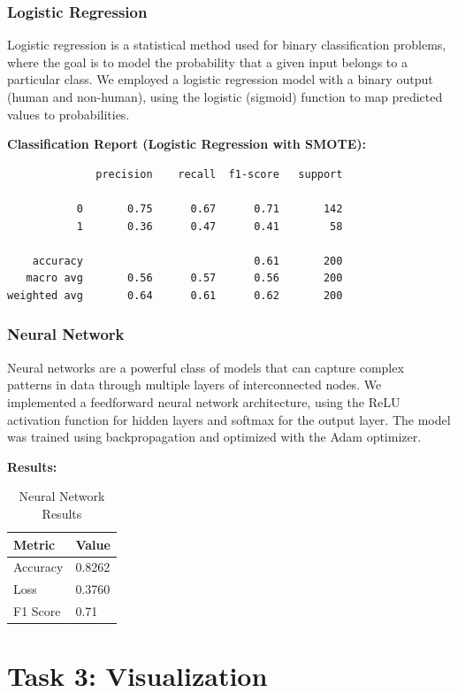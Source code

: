 \documentclass[a4paper,11pt]{article}
\begin{document}
\subsubsection*{Logistic Regression}
Logistic regression is a statistical method used for binary classification problems, where the goal is to model the probability that a given input belongs to a particular class. We employed a logistic regression model with a binary output (human and non-human), using the logistic (sigmoid) function to map predicted values to probabilities.

\textbf{Classification Report (Logistic Regression with SMOTE):}
\begin{verbatim}
              precision    recall  f1-score   support

           0       0.75      0.67      0.71       142
           1       0.36      0.47      0.41        58

    accuracy                           0.61       200
   macro avg       0.56      0.57      0.56       200
weighted avg       0.64      0.61      0.62       200
\end{verbatim}



\subsubsection*{Neural Network}
Neural networks are a powerful class of models that can capture complex patterns in data through multiple layers of interconnected nodes. We implemented a feedforward neural network architecture, using the ReLU activation function for hidden layers and softmax for the output layer. The model was trained using backpropagation and optimized with the Adam optimizer.

\textbf{Results:}
\begin{table}[h]
    \centering
    \begin{tabular}{|l|l|}
        \hline
        \textbf{Metric} & \textbf{Value} \\
        \hline
        Accuracy & 0.8262 \\
        Loss & 0.3760 \\
        F1 Score & 0.71 \\
        \hline
    \end{tabular}
    \caption{Neural Network Results}
\end{table}

\section{Task 3: Visualization}
\end{document}
